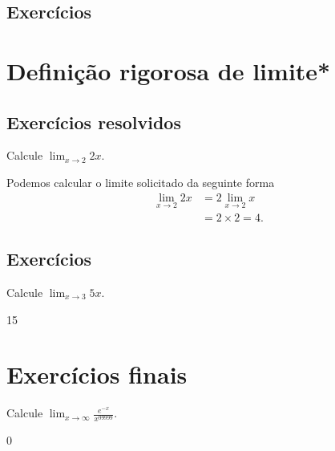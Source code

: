 \construirExeresol


\subsection*{Exercícios}

\construirExer


\section{Definição rigorosa de limite*}\label{sec:limites_def_rigor}
\construirSec

\subsection*{Exercícios resolvidos}

\construirExeresol

\begin{exeresol}
  Calcule $\lim_{x\to 2} 2x$.
\end{exeresol}
\begin{resol}
  Podemos calcular o limite solicitado da seguinte forma
  \begin{equation}
    \begin{split}
      \lim_{x\to 2} 2x &= 2\lim_{x\to 2} x\\
      &= 2\times 2 = 4.
    \end{split}
  \end{equation}
\end{resol}

\subsection*{Exercícios}

\construirExer

\begin{exer}
  Calcule $\lim_{x\to 3} 5x$.
\end{exer}
\begin{resp}
  15
\end{resp}

\section{Exercícios finais}

\construirExer

\begin{exer}
  Calcule $\displaystyle\lim_{x\to \infty} \frac{e^{-x}}{x^{99999}}$.
\end{exer}
\begin{resp}
  0
\end{resp}

